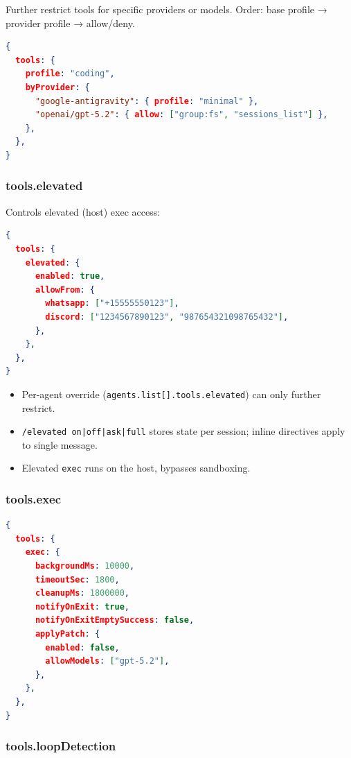 Further restrict tools for specific providers or models. Order: base profile → provider profile → allow/deny.

\begin{lstlisting}[language=json]
{
  tools: {
    profile: "coding",
    byProvider: {
      "google-antigravity": { profile: "minimal" },
      "openai/gpt-5.2": { allow: ["group:fs", "sessions_list"] },
    },
  },
}
\end{lstlisting}


\subsubsection{tools.elevated}


Controls elevated (host) exec access:

\begin{lstlisting}[language=json]
{
  tools: {
    elevated: {
      enabled: true,
      allowFrom: {
        whatsapp: ["+15555550123"],
        discord: ["1234567890123", "987654321098765432"],
      },
    },
  },
}
\end{lstlisting}


\begin{itemize}
  \item Per-agent override (\texttt{agents.list[].tools.elevated}) can only further restrict.
  \item \texttt{/elevated on|off|ask|full} stores state per session; inline directives apply to single message.
  \item Elevated \texttt{exec} runs on the host, bypasses sandboxing.
\end{itemize}


\subsubsection{tools.exec}


\begin{lstlisting}[language=json]
{
  tools: {
    exec: {
      backgroundMs: 10000,
      timeoutSec: 1800,
      cleanupMs: 1800000,
      notifyOnExit: true,
      notifyOnExitEmptySuccess: false,
      applyPatch: {
        enabled: false,
        allowModels: ["gpt-5.2"],
      },
    },
  },
}
\end{lstlisting}


\subsubsection{tools.loopDetection}



